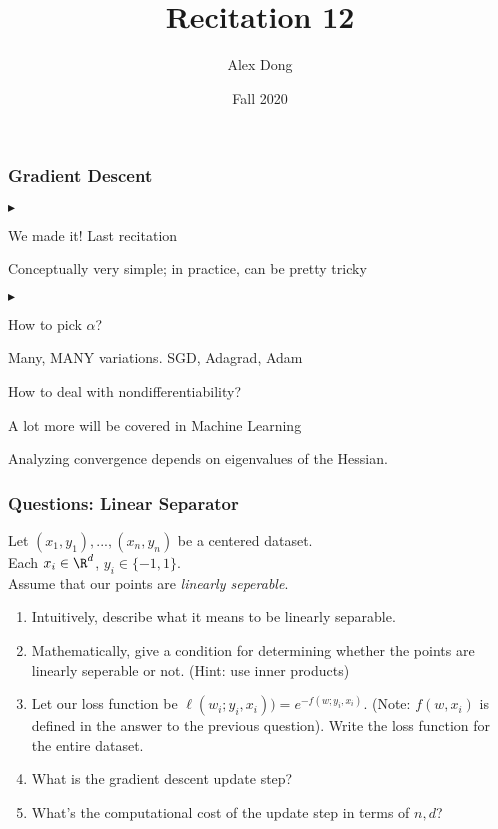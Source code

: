 \documentclass{beamer}
\title{Recitation 12}
\author{Alex Dong}
\institute{CDS, NYU}
\date{Fall 2020}
\renewenvironment{itemize}
\renewenvironment{enumerate}%
{\begin{list}{\arabic{enumi}.}%
      {\setlength{\leftmargin}{2.5em}%
       \setlength{\itemsep}{-\parsep}%
       \setlength{\topsep}{-\parskip}%
       \usecounter{enumi}}%
 }{\end{list}}
\renewenvironment{itemize}%
{\begin{list}{$\blacktriangleright$}%
      {\setlength{\leftmargin}{2.5em}%
       \setlength{\itemsep}{-\parsep}%
       \setlength{\topsep}{-\parskip}%
       \usecounter{enumi}}%
 }{\end{list}}
\begin{document}
\frame{\titlepage} 

\begin{frame}
\frametitle{Gradient Descent}
\begin{itemize}
\item We made it! Last recitation
\item Conceptually very simple; in practice, can be pretty tricky
\begin{itemize}
\item How to pick $\alpha$?
\item Many, MANY variations. SGD, Adagrad, Adam
\item How to deal with nondifferentiability?
\item A lot more will be covered in Machine Learning
\end{itemize}
\item Analyzing convergence depends on eigenvalues of the Hessian.
\end{itemize}
\end{frame}


\begin{frame}
\frametitle{Questions: Linear Separator }
Let $(x_1,y_1),...,(x_n,y_n)$ be a centered dataset. \\
Each $x_i\in\R^d$, $y_i\in\{-1,1\}$.\\
Assume that our points are \textit{linearly seperable}.
\begin{enumerate}
\item Intuitively, describe what it means to be linearly separable. 
\item Mathematically, give a condition for determining whether the points are linearly seperable or not. (Hint: use inner products)
\item Let our loss function be $\ell(w_i;y_i,x_i)) = e^{-f(w;y_i,x_i)}$. (Note: $f(w,x_i)$ is defined in the answer to the previous question). Write the loss function for the entire dataset.
\item What is the gradient descent update step?
\item What's the computational cost of the update step in terms of $n, d$?
\end{enumerate}
\end{frame}
\end{document}
